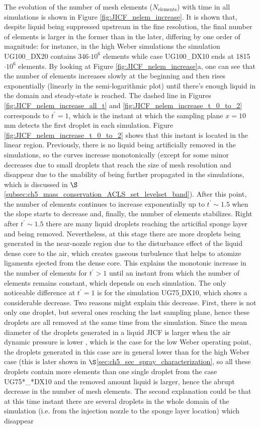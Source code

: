 The evolution of the number of mesh elements ($N_\mathrm{elements}$) with time in all simulations is shown in Figure \ref{fig:JICF_nelem_increase}. It is shown that, despite liquid being suppressed upstream in the fine resolution, the final number of elements is larger in the former than in the later, differing by one order of magnitude: for instance, in the high Weber simulations the simulation UG100\_DX20 contains 346$\cdot 10^6$ elements while case UG100\_DX10 ends at 1815$\cdot 10^6$ elements. By looking at Figure \ref{fig:JICF_nelem_increase}a, one can see that the number of elements increases slowly at the beginning and then rises exponentially (linearly in the semi-logarithmic plot) until there’s enough liquid in the domain and steady-state is reached. The dashed line in Figures \ref{fig:JICF_nelem_increase_all_t} and  \ref{fig:JICF_nelem_increase_t_0_to_2} corresponds  to $t^{\prime} = 1$, which is the instant at which the sampling plane $x = 10$ mm detects the first droplet in each simulation. Figure \ref{fig:JICF_nelem_increase_t_0_to_2} shows that this instant is located in the linear region. Previously, there is no liquid being artificially removed in the simulations, so the curves increase monotonically (except for some minor decreases due to small droplets that reach the size of mesh resolution and disappear due to the unability of being further propagated in the simulations, which is discussed in $\S$\ref{subsec:ch5_mass_conservation_ACLS_set_levelset_band}). After this point, the number of elements continues to increase exponentially up to $t^{\prime} \sim 1.5$ when the slope starts to decrease and, finally, the number of elements  stabilizes. Right after $t^{\prime} \sim 1.5$ there are many liquid droplets reaching the articifial sponge layer and being removed. Nevertheless, at this stage there are more droplets being generated in the near-nozzle region due to the disturbance effect of the liquid dense core to the air, which creates gaseous turbulence that helps to atomize ligaments ejected from the dense core. This explains the monotonic increase in the number of elements for $t^{\prime} > 1$ until an instant from which the number of elements remains constant, which depends on each simulation. The only noticeable difference at $t^{\prime} = 1$ is for the simulation UG75$\_$DX10, which shows a considerable decrease. Two reasons might explain this decrease. First, there is not only one droplet, but several ones reaching the last sampling plane, hence these droplets are all removed at the same time from the simulation. Since the mean diameter of the droplets generated in a liquid JICF is larger when the air dynamic pressure is lower , which is the case for the low Weber operating point, the droplets generated in this case are in general lower than for the high Weber case (this is later shown in $\S$\ref{sec:ch5_sec_spray_characterization}, so all these droplets contain more elements than one single droplet from the case UG75*\_*DX10 and the removed amount liquid is larger, hence the abrupt decrease in the number of mesh elements. The second explanation could be that at this time instant there are several droplets in the whole domain of the simulation (i.e. from the injection nozzle to the sponge layer location) which disappear 